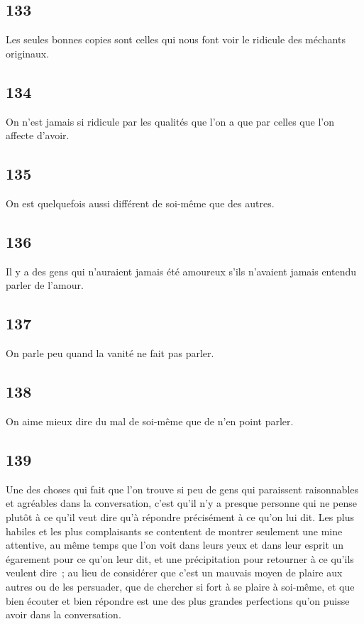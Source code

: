 \documentclass[french,twoside]{book} %
\begin{document}
\subsection[{133}]{ \textsc{133} }
\noindent Les seules bonnes copies sont celles qui nous font voir le ridicule des méchants originaux.
\subsection[{134}]{ \textsc{134} }
\noindent On n’est jamais si ridicule par les qualités que l’on a que par celles que l’on affecte d’avoir.
\subsection[{135}]{ \textsc{135} }
\noindent On est quelquefois aussi différent de soi-même que des autres.
\subsection[{136}]{ \textsc{136} }
\noindent Il y a des gens qui n’auraient jamais été amoureux s’ils n’avaient jamais entendu parler de l’amour.
\subsection[{137}]{ \textsc{137} }
\noindent On parle peu quand la vanité ne fait pas parler.
\subsection[{138}]{ \textsc{138} }
\noindent On aime mieux dire du mal de soi-même que de n’en point parler.
\subsection[{139}]{ \textsc{139} }
\noindent Une des choses qui fait que l’on trouve si peu de gens qui paraissent raisonnables et agréables dans la conversation, c’est qu’il n’y a presque personne qui ne pense plutôt à ce qu’il veut dire qu’à répondre précisément à ce qu’on lui dit. Les plus habiles et les plus complaisants se contentent de montrer seulement une mine attentive, au même temps que l’on voit dans leurs yeux et dans leur esprit un égarement pour ce qu’on leur dit, et une précipitation pour retourner à ce qu’ils veulent dire ; au lieu de considérer que c’est un mauvais moyen de plaire aux autres ou de les persuader, que de chercher si fort à se plaire à soi-même, et que bien écouter et bien répondre est une des plus grandes perfections qu’on puisse avoir dans la conversation.
\end{document}
